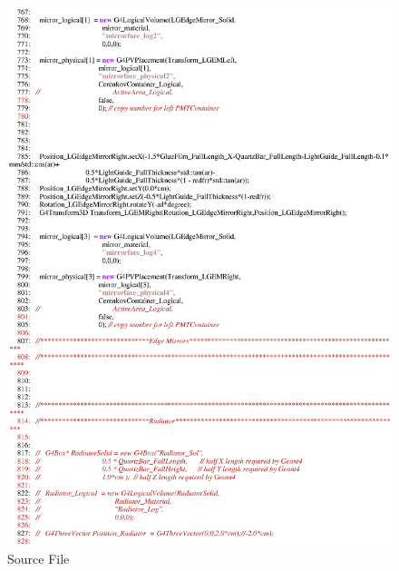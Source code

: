 \begin{figure}[ht]
  \hspace{0cm}
  \includegraphics[scale=0.8]{./figures5/QweakSimCerenkovDetector.cc-p13.eps}
  \caption{\label{SourceV13} Source File}
           \label{fig:V-SC-17}
\end{figure}
\clearpage


